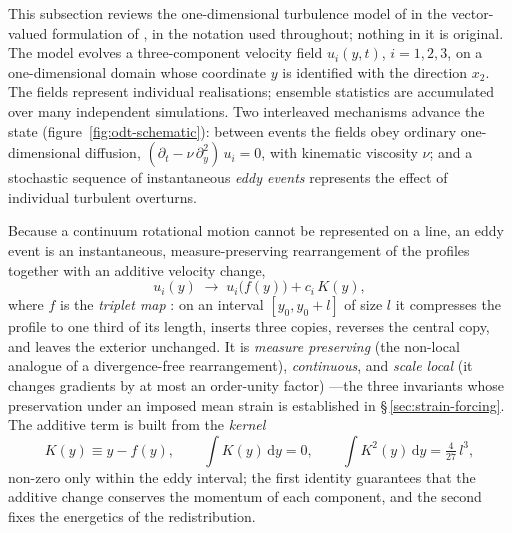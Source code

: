 \documentclass[lineno]{JFM-FLM_Au}
\begin{document}
This subsection reviews the one-dimensional turbulence model of
\citet{Kerstein1999} in the vector-valued formulation of
\citet{Kerstein2001}, in the notation used throughout; nothing in it is
original. The model evolves a three-component velocity field $u_i(y,t)$,
$i=1,2,3$, on a one-dimensional domain whose coordinate $y$ is identified
with the direction $x_2$. The fields represent individual realisations;
ensemble statistics are accumulated over many independent simulations.
Two interleaved mechanisms advance the state
(figure~\ref{fig:odt-schematic}): between events the fields
obey ordinary one-dimensional diffusion,
$(\partial_t-\nu\,\partial_y^2)\,u_i=0$, with kinematic viscosity $\nu$;
and a stochastic sequence of instantaneous \emph{eddy events} represents
the effect of individual turbulent overturns.


Because a continuum rotational motion cannot be represented on a line, an
eddy event is an instantaneous, measure-preserving rearrangement of the
profiles together with an additive velocity change,
\begin{equation}
  u_i(y)\;\longrightarrow\;u_i\!\big(f(y)\big)+c_i\,K(y),
  \label{eq:event}
\end{equation}
where $f$ is the \emph{triplet map}
\citep{Kerstein1991,Kerstein1999}: on an interval $[y_0,y_0+l]$ of size
$l$ it compresses the profile to one third of its length, inserts three
copies, reverses the central copy, and leaves the exterior unchanged.
It is \emph{measure preserving} (the non-local analogue of a
divergence-free rearrangement), \emph{continuous}, and \emph{scale
local} (it changes gradients by at most an order-unity factor)
\citep{Kerstein2001}---the
three invariants whose preservation under an imposed mean strain is
established in \S\,\ref{sec:strain-forcing}. The additive term is built
from the \emph{kernel}
\begin{equation}
  K(y)\equiv y-f(y),
  \qquad
  \int K(y)\,\mathrm{d}y = 0,
  \qquad
  \int K^2(y)\,\mathrm{d}y = \tfrac{4}{27}\,l^{3},
  \label{eq:kernel-identities}
\end{equation}
non-zero only within the eddy interval; the first identity guarantees
that the additive change conserves the momentum of each component, and
the second fixes the energetics of the redistribution.
\end{document}
